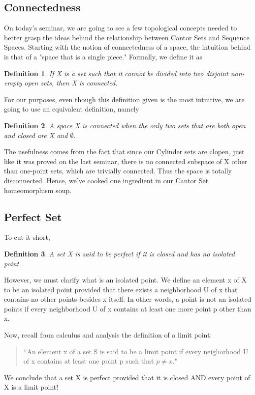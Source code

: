 \documentclass{article}
\newtheorem*{def*}{Definition}
\begin{document}
\subsection{Connectedness}
On today's seminar, we are going to see a few topological concepts needed to better grasp the ideas behind
the relationship between Cantor Sets and Sequence Spaces. Starting with the notion of connectedness of a space,
the intuition behind is that of a "space that is a single piece." Formally, we define it as
\begin{def*}
  If X is a set such that it cannot be divided into two disjoint non-empty open sets, then X is connected.
\end{def*}
For our purposes, even though this definition given is the most intuitive, we are going to use an equivalent 
definition, namely 
 \begin{def*}
   A space X is connected when the only two sets that are both open and closed are X and $\emptyset.$
 \end{def*}
 The usefulness comes from the fact that since our Cylinder sets are clopen, just like it was proved on the last
seminar, there is no connected subspace of X other than one-point sets, which are trivially connected. Thus the 
space is totally disconnected. Hence, we've cooked one ingredient in our Cantor Set homeomorphism soup.

\subsection{Perfect Set}
To cut it short, 
\begin{def*}
  A set X is said to be perfect if it is closed and has no isolated point.
\end{def*}
However, we must clarify what is an isolated point. We define an element x of X to be an isolated point provided
that there exists a neighborhood U of x that contains no other points besides x itself. In other words,
a point is not an isolated points if every neighborhood U of x contains at least one more point p other than x.

Now, recall from calculus and analysis the definition of a limit point:
\begin{quote}
  ``An element x of a set S is said to be a limit point if every neighorhood U of x contains at least one point
  p such that $p\neq{x}.$"  
\end{quote}
We conclude that a set X is perfect provided that it is closed AND every point of X is a limit point! 
\end{document}
